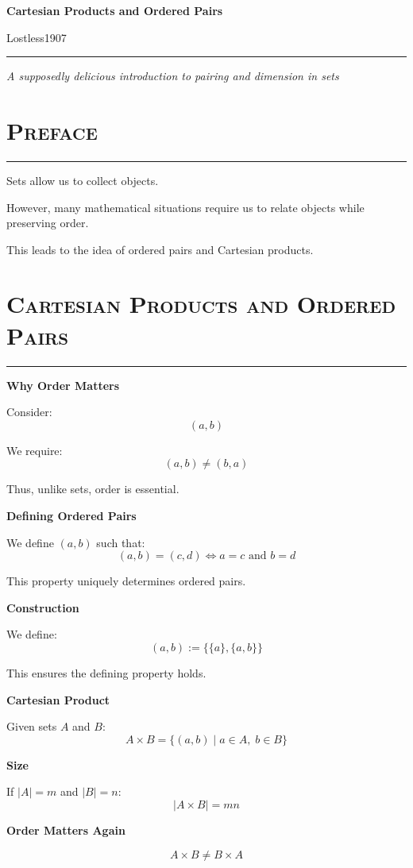 \documentclass[11pt]{article}
\newcommand{\sepline}{
    \vspace{0.5em}
    \hrule
    \vspace{1em}
}
\begin{document}
\begin{titlepage}
\centering
\vspace*{3cm}

{\Huge \bfseries Cartesian Products and Ordered Pairs \par}

\vspace{1cm}

{\large Lostless1907 \par}

\vfill

\sepline

{\large \textit{A supposedly delicious introduction to pairing and dimension in sets}}

\end{titlepage}

\section*{\textsc{Preface}}
\sepline

Sets allow us to collect objects.

However, many mathematical situations require us to relate objects while preserving order.

This leads to the idea of ordered pairs and Cartesian products.

\section*{\textsc{Cartesian Products and Ordered Pairs}}
\sepline

\begin{theorybox}

\textbf{Why Order Matters}

Consider:
\[
(a,b)
\]

We require:
\[
(a,b) \neq (b,a)
\]

Thus, unlike sets, order is essential.

\textbf{Defining Ordered Pairs}

We define $(a,b)$ such that:
\[
(a,b) = (c,d) \iff a = c \text{ and } b = d
\]

This property uniquely determines ordered pairs.

\textbf{Construction}

We define:
\[
(a,b) := \{\{a\}, \{a,b\}\}
\]

This ensures the defining property holds.

\textbf{Cartesian Product}

Given sets $A$ and $B$:
\[
A \times B = \{(a,b) \mid a \in A,\; b \in B\}
\]

\textbf{Size}

If $|A| = m$ and $|B| = n$:
\[
|A \times B| = mn
\]

\textbf{Order Matters Again}

\[
A \times B \neq B \times A
\]

\end{theorybox}
\end{document}
